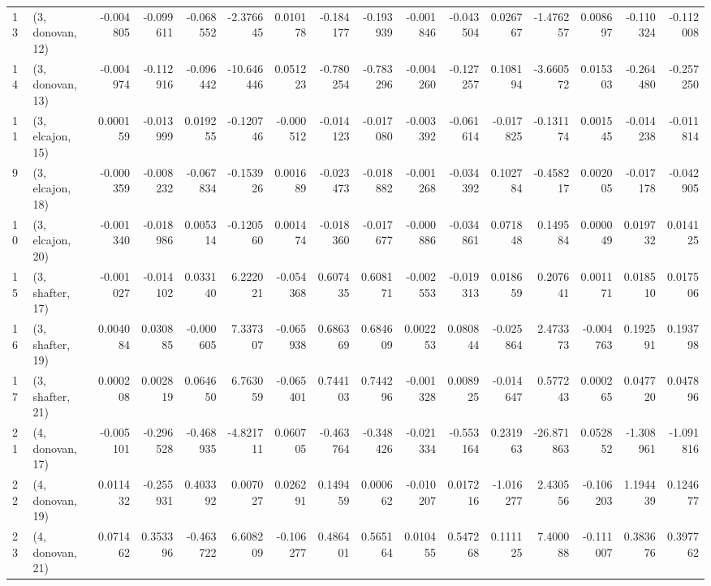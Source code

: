 \begin{tabular}{llrrrrrrrrrrrrrr}
13 &  (3, donovan, 12) &  -0.004805 & -0.099611 & -0.068552 &  -2.376645 &  0.010178 &  -0.184177 & -0.193939 & -0.001846 & -0.043504 &  0.026767 &  -1.476257 &  0.008697 & -0.110324 & -0.112008 \\
14 &  (3, donovan, 13) &  -0.004974 & -0.112916 & -0.096442 & -10.646446 &  0.051223 &  -0.780254 & -0.783296 & -0.004260 & -0.127257 &  0.108194 &  -3.660572 &  0.015303 & -0.264480 & -0.257250 \\
11 &  (3, elcajon, 15) &   0.000159 & -0.013999 &  0.019255 &  -0.120746 & -0.000512 &  -0.014123 & -0.017080 & -0.003392 & -0.061614 & -0.017825 &  -0.131174 &  0.001545 & -0.014238 & -0.011814 \\
9  &  (3, elcajon, 18) &  -0.000359 & -0.008232 & -0.067834 &  -0.153926 &  0.001689 &  -0.023473 & -0.018882 & -0.001268 & -0.034392 &  0.102784 &  -0.458217 &  0.002005 & -0.017178 & -0.042905 \\
10 &  (3, elcajon, 20) &  -0.001340 & -0.018986 &  0.005314 &  -0.120560 &  0.001474 &  -0.018360 & -0.017677 & -0.000886 & -0.034861 &  0.071848 &   0.149584 &  0.000049 &  0.019732 &  0.014125 \\
15 &  (3, shafter, 17) &  -0.001027 & -0.014102 &  0.033140 &   6.222021 & -0.054368 &   0.607435 &  0.608171 & -0.002553 & -0.019313 &  0.018659 &   0.207641 &  0.001171 &  0.018510 &  0.017506 \\
16 &  (3, shafter, 19) &   0.004084 &  0.030885 & -0.000605 &   7.337307 & -0.065938 &   0.686369 &  0.684609 &  0.002253 &  0.080844 & -0.025864 &   2.473373 & -0.004763 &  0.192591 &  0.193798 \\
17 &  (3, shafter, 21) &   0.000208 &  0.002819 &  0.064650 &   6.763059 & -0.065401 &   0.744103 &  0.744296 & -0.001328 &  0.008925 & -0.014647 &   0.577243 &  0.000265 &  0.047720 &  0.047896 \\
21 &  (4, donovan, 17) &  -0.005101 & -0.296528 & -0.468935 &  -4.821711 &  0.060705 &  -0.463764 & -0.348426 & -0.021334 & -0.553164 &  0.231963 & -26.871863 &  0.052852 & -1.308961 & -1.091816 \\
22 &  (4, donovan, 19) &   0.011432 & -0.255931 &  0.403392 &   0.007027 &  0.026291 &   0.149459 &  0.000662 & -0.010207 &  0.017216 & -1.016277 &   2.430556 & -0.106203 &  1.194439 &  0.124677 \\
23 &  (4, donovan, 21) &   0.071462 &  0.353396 & -0.463722 &   6.608209 & -0.106277 &   0.486401 &  0.565164 &  0.010455 &  0.547268 &  0.111125 &   7.400088 & -0.111007 &  0.383676 &  0.397762 \\

\end{tabular}
